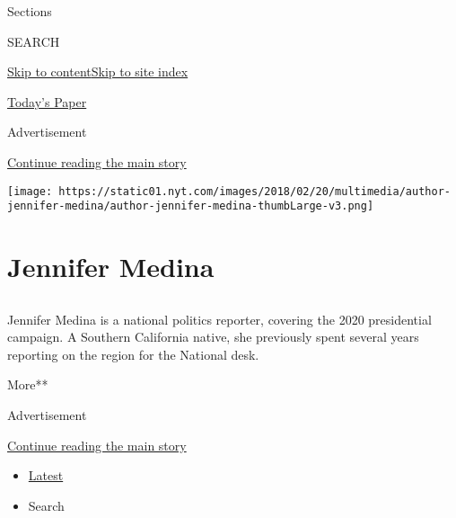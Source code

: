 Sections

SEARCH

\protect\hyperlink{site-content}{Skip to
content}\protect\hyperlink{site-index}{Skip to site index}

\href{https://myaccount.nytimes.com/auth/login?response_type=cookie\&client_id=vi}{}

\href{https://www.nytimes.com/section/todayspaper}{Today's Paper}

Advertisement

\protect\hyperlink{after-top}{Continue reading the main story}

\texttt{[image: https://static01.nyt.com/images/2018/02/20/multimedia/author-jennifer-medina/author-jennifer-medina-thumbLarge-v3.png]}

\hypertarget{jennifer-medina}{%
\section{Jennifer Medina}\label{jennifer-medina}}

\subsection{}

Jennifer Medina is a national politics reporter, covering the 2020
presidential campaign. A Southern California native, she previously
spent several years reporting on the region for the National desk.

More**

Advertisement

\protect\hyperlink{after-mid1}{Continue reading the main story}

\begin{itemize}
\tightlist
\item
  \protect\hyperlink{stream-panel}{Latest}
\item
  Search
\end{itemize}

